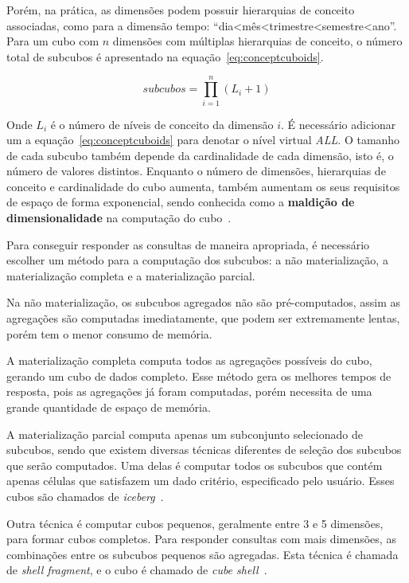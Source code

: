 Porém, na prática, as dimensões podem possuir hierarquias de conceito associadas, como para a dimensão tempo: ``dia<mês<trimestre<semestre<ano''.
Para um cubo com $n$ dimensões com múltiplas hierarquias de conceito, o número total de subcubos é apresentado na equação~\ref{eq:conceptcuboids}.

\begin{equation}
	subcubos = \prod_{i=1}^n (L_i + 1)
\label{eq:conceptcuboids}
\end{equation}

Onde $L_i$ é o número de níveis de conceito da dimensão $i$.
É necessário adicionar um a equação~\ref{eq:conceptcuboids} para denotar o nível virtual \textit{ALL}.
O tamanho de cada subcubo também depende da cardinalidade de cada dimensão, isto é, o número de valores distintos.
Enquanto o número de dimensões, hierarquias de conceito e cardinalidade do cubo aumenta, também aumentam os seus requisitos de espaço de forma exponencial, sendo conhecida como a \textbf{maldição de dimensionalidade} na computação do cubo~\cite{hanDataMiningConcepts2011}.

Para conseguir responder as consultas de maneira apropriada, é necessário escolher um método para a computação dos subcubos: a não materialização, a materialização completa e a materialização parcial.

Na não materialização, os subcubos agregados não são pré-computados, assim as agregações são computadas imediatamente, que podem ser extremamente lentas, porém tem o menor consumo de memória.

A materialização completa computa todos as agregações possíveis do cubo, gerando um cubo de dados completo.
Esse método gera os melhores tempos de resposta, pois as agregações já foram computadas, porém necessita de uma grande quantidade de espaço de memória.

A materialização parcial computa apenas um subconjunto selecionado de subcubos, sendo que existem diversas técnicas diferentes de seleção dos subcubos que serão computados.
Uma delas é computar todos os subcubos que contém apenas células que satisfazem um dado critério, especificado pelo usuário.
Esses cubos são chamados de \textit{iceberg}~\cite{beyerBottomupComputationSparse1999}.

Outra técnica é computar cubos pequenos, geralmente entre 3 e 5 dimensões, para formar cubos completos.
Para responder consultas com mais dimensões, as combinações entre os subcubos pequenos são agregadas.
Esta técnica é chamada de \textit{shell fragment}, e o cubo é chamado de \textit{cube shell}~\cite{liHighdimensionalOLAPMinimal2004}.

